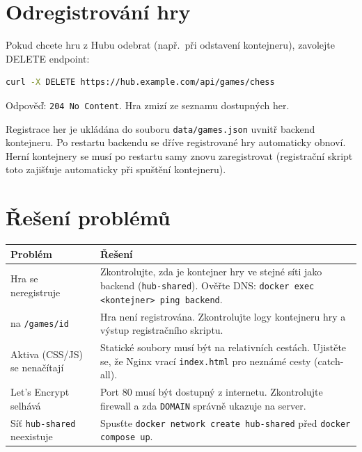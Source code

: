 \documentclass[12pt,a4paper]{article}
\begin{document}
\clearpage
\section{Odregistrování hry}

Pokud chcete hru z Hubu odebrat (např.\ při odstavení kontejneru), zavolejte DELETE endpoint:

\begin{lstlisting}[language=bash]
  curl -X DELETE https://hub.example.com/api/games/chess
\end{lstlisting}

Odpověď: \texttt{204 No Content}. Hra zmizí ze seznamu dostupných her.

\begin{infobox}
Registrace her je ukládána do souboru \texttt{data/games.json} uvnitř backend kontejneru. Po restartu backendu se dříve registrované hry automaticky obnoví. Herní kontejnery se musí po restartu samy znovu zaregistrovat (registrační skript toto zajišťuje automaticky při spuštění kontejneru).
\end{infobox}

\clearpage
\section{Řešení problémů}

\begin{center}
\begin{tabular}{@{}p{5cm}p{9cm}@{}}
\toprule
\textbf{Problém} & \textbf{Řešení} \\
\midrule
Hra se neregistruje & Zkontrolujte, zda je kontejner hry ve stejné síti jako backend (\texttt{hub-shared}). Ověřte DNS: \texttt{docker exec <kontejner> ping backend}. \\
\addlinespace
404 na \texttt{/games/id} & Hra není registrována. Zkontrolujte logy kontejneru hry a výstup registračního skriptu. \\
\addlinespace
Aktiva (CSS/JS) se nenačítají & Statické soubory musí být na relativních cestách. Ujistěte se, že Nginx vrací \texttt{index.html} pro neznámé cesty (catch-all). \\
\addlinespace
Let's Encrypt selhává & Port 80 musí být dostupný z internetu. Zkontrolujte firewall a zda \texttt{DOMAIN} správně ukazuje na server. \\
\addlinespace
Síť \texttt{hub-shared} neexistuje & Spusťte \texttt{docker network create hub-shared} před \texttt{docker compose up}. \\
\bottomrule
\end{tabular}
\end{center}
\end{document}
